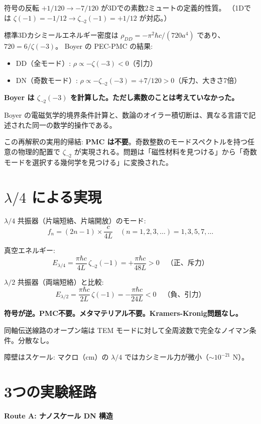 \documentclass[11pt,a4paper]{article}
\begin{document}
符号の反転 $+1/120 \to -7/120$ が3Dでの素数2ミュートの定義的性質。
（1Dでは $\zeta(-1) = -1/12 \to \zeta_{\neg 2}(-1) = +1/12$ が対応。）

標準3Dカシミールエネルギー密度は $\rho_{DD} = -\pi^2\hbar c/(720a^4)$ であり、$720 = 6/\zeta(-3)$。
Boyer の PEC-PMC の結果:
\begin{itemize}
\item DD（全モード）: $\rho \propto -\zeta(-3) < 0$（引力）
\item DN（奇数モード）: $\rho \propto -\zeta_{\neg 2}(-3) = +7/120 > 0$（斥力、大きさ7倍）
\end{itemize}

\textbf{Boyer は $\zeta_{\neg 2}(-3)$ を計算した。ただし素数のことは考えていなかった。}

Boyer の電磁気学的境界条件計算と、数論のオイラー積切断は、異なる言語で記述された同一の数学的操作である。

この再解釈の実用的帰結: \textbf{PMC は不要}。奇数整数のモードスペクトルを持つ任意の物理的配置で $\zeta_{\neg 2}$ が実現される。問題は「磁性材料を見つける」から「奇数モードを選択する幾何学を見つける」に変換された。

\section{$\lambda/4$ による実現}

$\lambda/4$ 共振器（片端短絡、片端開放）のモード:
$$f_n = (2n-1) \times \frac{c}{4L} \quad (n=1,2,3,\ldots) = 1, 3, 5, 7, \ldots$$

真空エネルギー:
$$E_{\lambda/4} = \frac{\pi\hbar c}{4L}\,\zeta_{\neg 2}(-1) = +\frac{\pi\hbar c}{48L} > 0 \quad\text{（正、斥力）}$$

$\lambda/2$ 共振器（両端短絡）と比較:
$$E_{\lambda/2} = \frac{\pi\hbar c}{2L}\,\zeta(-1) = -\frac{\pi\hbar c}{24L} < 0 \quad\text{（負、引力）}$$

\textbf{符号が逆。PMC不要。メタマテリアル不要。Kramers-Kronig問題なし。}

同軸伝送線路のオープン端は TEM モードに対して全周波数で完全なノイマン条件。分散なし。

障壁はスケール: マクロ（cm）の $\lambda/4$ ではカシミール力が微小（$\sim 10^{-21}$ N）。

\section{3つの実験経路}

\textbf{Route A: ナノスケール DN 構造}
\end{document}
